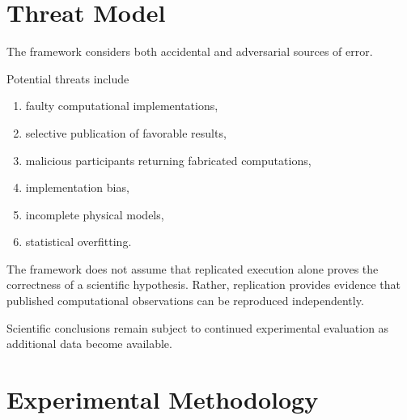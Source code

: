 \documentclass[11pt]{article}
\begin{document}


\section{Threat Model}

The framework considers
both accidental
and adversarial sources of error.

Potential threats include

\begin{enumerate}

\item
faulty computational implementations,

\item
selective publication of favorable results,

\item
malicious participants returning fabricated computations,

\item
implementation bias,

\item
incomplete physical models,

\item
statistical overfitting.

\end{enumerate}

The framework does not assume
that replicated execution alone
proves the correctness of a scientific hypothesis.
Rather,
replication provides evidence that
published computational observations
can be reproduced independently.

Scientific conclusions remain subject
to continued experimental evaluation
as additional data become available.



\section{Experimental Methodology}
\end{document}
